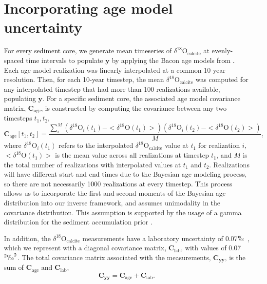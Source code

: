 \documentclass[draft]{agujournal2019}
\begin{document}
\section{Incorporating age model uncertainty \label{sec:agemodel}}
For every sediment core, we generate mean timeseries of
$\delta^{18}\mathrm{O}_{\mathrm{calcite}}$ at evenly-spaced time intervals
to populate $\mathbf{y}$ by applying the Bacon age models
\cite[]{Bacon, McKay-Emile-Geay-2021:R} from
. Each age model realization was linearly
interpolated at a common 10-year resolution. Then, for each 10-year
timestep, the mean $\delta^{18}\mathrm{O}_{\mathrm{calcite}}$ was computed
for any interpolated timestep that had more than 100 realizations
available, populating $\mathbf{y}$. For a specific sediment core, the
associated age model covariance matrix, $\mathbf{C_{\mathrm{age}}}$,
is constructed by computing the covariance between any two timesteps
$t_{1}, t_{2}$,
\begin{equation}
\label{eq:covariance}
  \mathbf{C_{\mathrm{age}}}[t_1, t_2] = \frac{\sum_i^M \left(\delta^{18}\mathrm{O}_i(t_1) - <\delta^{18}\mathrm{O}(t_1)>
    \right) \left( \delta^{18}\mathrm{O}_i(t_2) - <\delta^{18}\mathrm{O}(t_2)> \right) }{M}, 
\end{equation}
where $\delta^{18}\mathrm{O}_{i}(t_1)$ refers to the interpolated
$\delta^{18}\mathrm{O}_{\mathrm{calcite}}$ value at $t_{1}$ for realization
$i$, $<\delta^{18}\mathrm{O}(t_1)>$ is the mean value across all
realizations at timestep $t_1$, and $M$ is the total number of
realizations with interpolated values at $t_{1}$ and
$t_{2}$. Realizations will have different start and end times due to
the Bayesian age modeling process, so there are not necessarily 1000
realizations at every timestep. This process allows us to incorporate
the first and second moments of the Bayesian age distribution into our
inverse framework, and assumes unimodality in the covariance
distribution. This assumption is supported by the usage of a gamma distribution for the sediment accumulation prior \cite[]{Bacon}.

In addition, the $\delta^{18}\mathrm{O}_{\mathrm{calcite}}$ measurements
have a laboratory uncertainty of 0.07$\permil$
\cite{Lu-Oppo-2023:Surface}, which we represent with a diagonal
covariance matrix, $\mathbf{C_{\mathrm{lab}}}$, with values of
0.07$^{2}\permil^{2}$. The total covariance matrix associated with the
measurements, $\mathbf{C_{yy}}$, is the sum of
$\mathbf{C_{\mathrm{age}}}$ and $\mathbf{C_{\mathrm{lab}}}$,
\begin{equation}
\label{eq:sumC}
\mathbf{C_{yy}} = \mathbf{C_{\mathrm{age}}} + \mathbf{C_{\mathrm{lab}}}. 
\end{equation}
\end{document}
